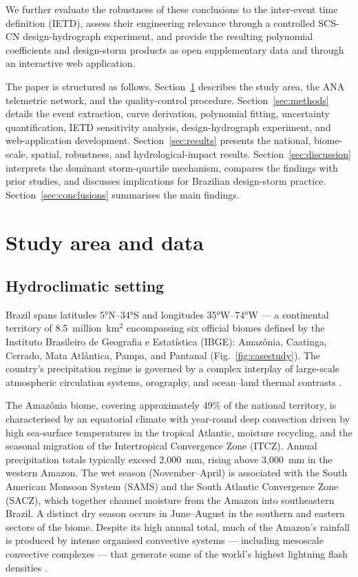 \documentclass[a4paper,fleqn]{cas-sc}
\begin{document}
We further evaluate the robustness of these conclusions to the inter-event time definition (IETD), assess their engineering relevance through a controlled SCS-CN design-hydrograph experiment, and provide the resulting polynomial coefficients and design-storm products as open supplementary data and through an interactive web application.

The paper is structured as follows. Section~\ref{sec:data} describes the study area, the ANA telemetric network, and the quality-control procedure. Section~\ref{sec:methods} details the event extraction, curve derivation, polynomial fitting, uncertainty quantification, IETD sensitivity analysis, design-hydrograph experiment, and web-application development. Section~\ref{sec:results} presents the national, biome-scale, spatial, robustness, and hydrological-impact results. Section~\ref{sec:discussion} interprets the dominant storm-quartile mechanism, compares the findings with prior studies, and discusses implications for Brazilian design-storm practice. Section~\ref{sec:conclusions} summarises the main findings.

\section{Study area and data}
\label{sec:data}

\subsection{Hydroclimatic setting}

Brazil spans latitudes 5°N–34°S and longitudes 35°W–74°W — a
continental territory of 8.5~million~km$^2$ encompassing six official
biomes defined by the Instituto Brasileiro de Geografia e Estatística
(IBGE): Amazônia, Caatinga, Cerrado, Mata Atlântica, Pampa, and
Pantanal (Fig.~\ref{fig:casestudy}). The country's precipitation
regime is governed by a complex interplay of large-scale atmospheric
circulation systems, orography, and ocean–land thermal contrasts
\citep{Marengo2012}.

The Amazônia biome, covering approximately 49\% of the national
territory, is characterised by an equatorial climate with year-round
deep convection driven by high sea-surface temperatures in the tropical
Atlantic, moisture recycling, and the seasonal migration of the
Intertropical Convergence Zone (ITCZ). Annual precipitation totals
typically exceed 2,000~mm, rising above 3,000~mm in the western
Amazon. The wet season (November–April) is associated with the
South American Monsoon System (SAMS) and the South Atlantic
Convergence Zone (SACZ), which together channel moisture from the
Amazon into southeastern Brazil. A distinct dry season occurs in
June–August in the southern and eastern sectors of the biome.
Despite its high annual total, much of the Amazon's rainfall is
produced by intense organised convective systems — including mesoscale
convective complexes — that generate some of the world's highest
lightning flash densities \citep{Zipser2006}.
\end{document}
